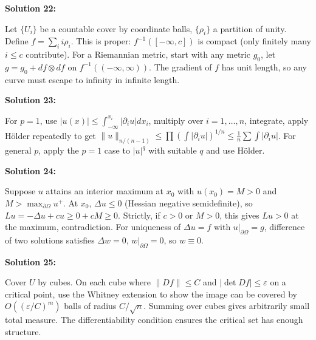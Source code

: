 \documentclass[12pt,a4paper]{exam}
\begin{document}
\vspace{0.5cm}

\textbf{Solution 22:}

Let $\{U_i\}$ be a countable cover by coordinate balls, $\{\rho_i\}$ a partition of unity. Define $f = \sum_i i \rho_i$. This is proper: $f^{-1}([-\infty, c])$ is compact (only finitely many $i \leq c$ contribute). For a Riemannian metric, start with any metric $g_0$, let $g = g_0 + df \otimes df$ on $f^{-1}((-\infty, \infty))$. The gradient of $f$ has unit length, so any curve must escape to infinity in infinite length.

\vspace{0.5cm}

\textbf{Solution 23:}

For $p=1$, use $|u(x)| \leq \int_{-\infty}^{x_i} |\partial_i u| dx_i$, multiply over $i=1,\ldots,n$, integrate, apply H\"older repeatedly to get $\|u\|_{n/(n-1)} \leq \prod (\int |\partial_i u|)^{1/n} \leq \frac{1}{n} \sum \int |\partial_i u|$. For general $p$, apply the $p=1$ case to $|u|^q$ with suitable $q$ and use H\"older.

\vspace{0.5cm}

\textbf{Solution 24:}

Suppose $u$ attains an interior maximum at $x_0$ with $u(x_0) = M > 0$ and $M > \max_{\partial\Omega} u^+$. At $x_0$, $\Delta u \leq 0$ (Hessian negative semidefinite), so $Lu = -\Delta u + c u \geq 0 + cM \geq 0$. Strictly, if $c>0$ or $M>0$, this gives $Lu > 0$ at the maximum, contradiction. For uniqueness of $\Delta u = f$ with $u|_{\partial\Omega} = g$, difference of two solutions satisfies $\Delta w = 0$, $w|_{\partial\Omega} = 0$, so $w \equiv 0$.

\vspace{0.5cm}

\textbf{Solution 25:}

Cover $U$ by cubes. On each cube where $\|Df\| \leq C$ and $|\det Df| \leq \varepsilon$ on a critical point, use the Whitney extension to show the image can be covered by $O((\varepsilon/C)^{m})$ balls of radius $C/\sqrt{n}$. Summing over cubes gives arbitrarily small total measure. The differentiability condition ensures the critical set has enough structure.

\vspace{0.5cm}
\end{document}
